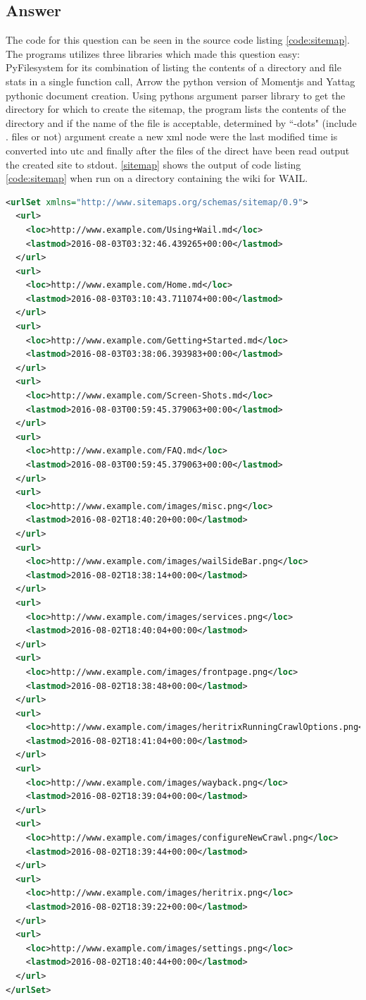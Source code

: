 \documentclass[11pt]{article}
\begin{document}
\subsection{Answer}
\setcounter{listing}{0}
The code for this question can be seen in the source code listing \hyperref[code:sitemap]{\ref{code:sitemap}}. The programs utilizes three libraries which made this question easy: PyFilesystem \cite{pyfs} for its combination of listing the contents of a directory and file stats in a single function call, Arrow \cite{arrow} the python version of Momentjs and Yattag\cite{yattag} pythonic document creation. Using pythons argument parser library to get the directory for which to create the sitemap, the program lists the contents of the directory and if the name of the file is acceptable, determined by ``-dots" (include . files or not) argument create a new xml node were the last modified time is converted into utc and finally after the files of the direct have been read output the created site to stdout.  \autoref{sitemap} shows the output of code listing \hyperref[code:sitemap]{\ref{code:sitemap}} when run on a directory containing the wiki for WAIL.
\begin{lstlisting}[language=xml, frame=single, caption={Sitemap of the Wiki for WAIL}, label=sitemap]
<urlSet xmlns="http://www.sitemaps.org/schemas/sitemap/0.9">
  <url>
    <loc>http://www.example.com/Using+Wail.md</loc>
    <lastmod>2016-08-03T03:32:46.439265+00:00</lastmod>
  </url>
  <url>
    <loc>http://www.example.com/Home.md</loc>
    <lastmod>2016-08-03T03:10:43.711074+00:00</lastmod>
  </url>
  <url>
    <loc>http://www.example.com/Getting+Started.md</loc>
    <lastmod>2016-08-03T03:38:06.393983+00:00</lastmod>
  </url>
  <url>
    <loc>http://www.example.com/Screen-Shots.md</loc>
    <lastmod>2016-08-03T00:59:45.379063+00:00</lastmod>
  </url>
  <url>
    <loc>http://www.example.com/FAQ.md</loc>
    <lastmod>2016-08-03T00:59:45.379063+00:00</lastmod>
  </url>
  <url>
    <loc>http://www.example.com/images/misc.png</loc>
    <lastmod>2016-08-02T18:40:20+00:00</lastmod>
  </url>
  <url>
    <loc>http://www.example.com/images/wailSideBar.png</loc>
    <lastmod>2016-08-02T18:38:14+00:00</lastmod>
  </url>
  <url>
    <loc>http://www.example.com/images/services.png</loc>
    <lastmod>2016-08-02T18:40:04+00:00</lastmod>
  </url>
  <url>
    <loc>http://www.example.com/images/frontpage.png</loc>
    <lastmod>2016-08-02T18:38:48+00:00</lastmod>
  </url>
  <url>
    <loc>http://www.example.com/images/heritrixRunningCrawlOptions.png</loc>
    <lastmod>2016-08-02T18:41:04+00:00</lastmod>
  </url>
  <url>
    <loc>http://www.example.com/images/wayback.png</loc>
    <lastmod>2016-08-02T18:39:04+00:00</lastmod>
  </url>
  <url>
    <loc>http://www.example.com/images/configureNewCrawl.png</loc>
    <lastmod>2016-08-02T18:39:44+00:00</lastmod>
  </url>
  <url>
    <loc>http://www.example.com/images/heritrix.png</loc>
    <lastmod>2016-08-02T18:39:22+00:00</lastmod>
  </url>
  <url>
    <loc>http://www.example.com/images/settings.png</loc>
    <lastmod>2016-08-02T18:40:44+00:00</lastmod>
  </url>
</urlSet>
\end{lstlisting}
\end{document}
